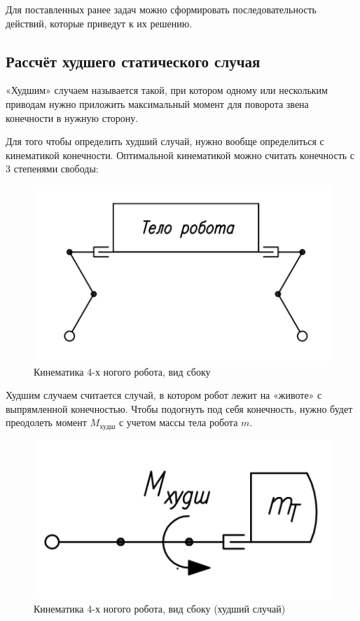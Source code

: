 Для поставленных ранее задач можно сформировать последовательность действий, которые приведут к их решению.

\subsection{Рассчёт худшего статического случая}

«Худшим» случаем называется такой, при котором одному или нескольким приводам нужно приложить максимальный момент для поворота звена конечности в нужную сторону.

Для того чтобы определить худший случай, нужно вообще определиться с кинематикой конечности. Оптимальной кинематикой можно считать конечность с 3 степенями свободы:

\begin{figure}[ht]
    \centering
    \includegraphics[scale=0.7]{kin1.png}
    \caption{Кинематика 4-х ногого робота, вид сбоку}
\end{figure}

Худшим случаем считается случай, в котором робот лежит на «животе» с выпрямленной конечностью. Чтобы подогнуть под себя конечность, нужно будет преодолеть момент $M_{худш}$ с учетом массы тела робота $m$.

\begin{figure}[ht]
    \centering
    \includegraphics[scale=1]{kin2.png}
    \caption{Кинематика 4-х ногого робота, вид сбоку (худший случай)}
\end{figure}

